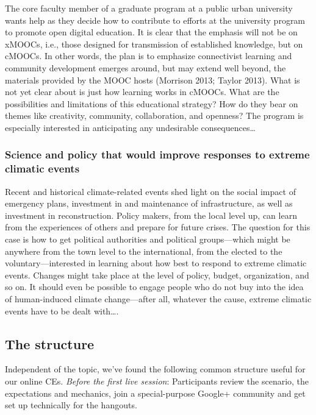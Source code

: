 The core faculty member of a graduate program at a public urban
university wants help as they decide how to contribute to efforts at the
university program to promote open digital education. It is clear that
the emphasis will not be on xMOOCs, i.e., those designed for
transmission of established knowledge, but on cMOOCs. In other words,
the plan is to emphasize connectivist learning and community development
emerges around, but may extend well beyond, the materials provided by
the MOOC hosts (Morrison 2013; Taylor 2013). What is not yet clear about
is just how learning works in cMOOCs. What are the possibilities and
limitations of this educational strategy? How do they bear on themes
like creativity, community, collaboration, and openness? The program is
especially interested in anticipating any undesirable
consequences\ldots{}

\subsubsection{Science and policy that would improve responses to
extreme climatic
events}\label{science-and-policy-that-would-improve-responses-to-extreme-climatic-events}

Recent and historical climate-related events shed light on the social
impact of emergency plans, investment in and maintenance of
infrastructure, as well as investment in reconstruction. Policy makers,
from the local level up, can learn from the experiences of others and
prepare for future crises. The question for this case is how to get
political authorities and political groups---which might be anywhere
from the town level to the international, from the elected to the
voluntary---interested in learning about how best to respond to extreme
climatic events. Changes might take place at the level of policy,
budget, organization, and so on. It should even be possible to engage
people who do not buy into the idea of human-induced climate
change---after all, whatever the cause, extreme climatic events have to
be dealt with\ldots{}.

\subsection{The structure}\label{the-structure}

Independent of the topic, we've found the following common structure
useful for our online CEs. \emph{Before the first live session}:
Participants review the scenario, the expectations and mechanics, join a
special-purpose Google+ community and get set up technically for the
hangouts.

